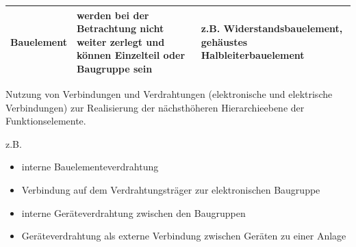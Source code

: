 \vspace{1cm}

\begin{tabular}{p{} p{} p{}}
\hline
Bauelement & werden bei der Betrachtung nicht weiter zerlegt und können Einzelteil oder Baugruppe sein & z.B. Widerstandsbauelement, gehäustes Halbleiterbauelement\\ \hline
\end{tabular}

\vspace{1cm}

Nutzung von Verbindungen und Verdrahtungen (elektronische und elektrische Verbindungen) zur Realisierung der nächsthöheren Hierarchieebene der Funktionselemente.

z.B.

\begin{itemize}
	\item interne Bauelementeverdrahtung
	\item Verbindung auf dem Verdrahtungsträger zur elektronischen Baugruppe
	\item interne Geräteverdrahtung zwischen den Baugruppen
	\item Geräteverdrahtung als externe Verbindung zwischen Geräten zu einer Anlage
\end{itemize}